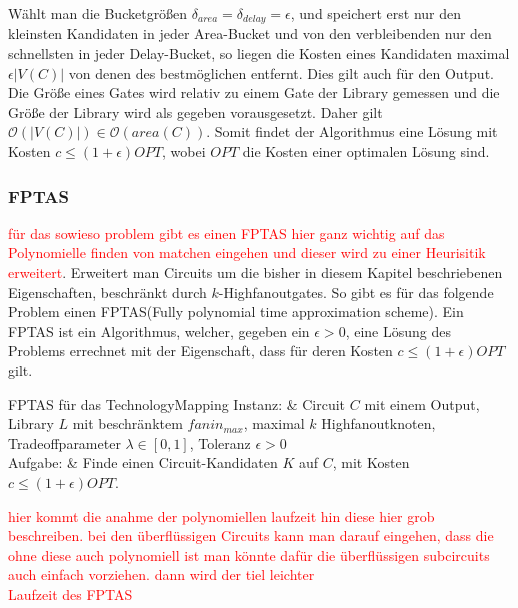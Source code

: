 \documentclass[11pt, a4paper, german]{article}
\newcommand{\TM}{TechnologyMapping}
\begin{document}
Wählt man die Bucketgrößen $\delta_{area} = \delta_{delay} = \epsilon$, und speichert erst nur den kleinsten Kandidaten in jeder Area-Bucket und von den verbleibenden nur den schnellsten in jeder Delay-Bucket, so liegen die Kosten eines Kandidaten maximal $\epsilon |V(C)|$ von denen des bestmöglichen entfernt. Dies gilt auch für den Output. \\
Die Größe eines Gates wird relativ zu einem Gate der Library gemessen und die Größe der Library wird als gegeben vorausgesetzt. Daher gilt  $\mathcal{O}(|V(C)|) \in \mathcal{O}(area(C)) $. Somit findet der Algorithmus eine Lösung mit Kosten $c\leq (1+\epsilon)OPT$, wobei $OPT$ die Kosten einer optimalen Lösung sind.

\subsubsection{FPTAS}
\label{subsubsec:fptas}
\textcolor{red}{für das sowieso problem gibt es einen FPTAS hier ganz wichtig auf das Polynomielle finden von matchen eingehen und dieser wird zu einer Heurisitik erweitert}. 
Erweitert man Circuits um die bisher in diesem Kapitel beschriebenen Eigenschaften, beschränkt durch $k$-Highfanoutgates. So gibt es für das folgende Problem einen FPTAS(Fully polynomial time approximation scheme). Ein FPTAS ist ein Algorithmus, welcher, gegeben ein $\epsilon > 0$, eine Lösung des Problems errechnet mit der Eigenschaft, dass für deren Kosten $c \leq (1+\epsilon)OPT$ gilt. \\
 \begin{problem}[framed]{FPTAS für das \TM}
  Instanz:  & Circuit $C$ mit einem Output, Library $L$ mit beschr\"anktem $fanin_{max}$, maximal $k$ Highfanoutknoten, Tradeoffparameter $\lambda \in [0,1]$, Toleranz $\epsilon > 0$ \\
  Aufgabe: &  Finde einen Circuit-Kandidaten $K$ auf $C$, mit Kosten $c \leq (1+\epsilon)OPT$.
\end{problem}
\textcolor{red}{hier kommt die anahme der polynomiellen laufzeit hin diese hier grob beschreiben. bei den überflüssigen Circuits kann man darauf eingehen, dass die ohne diese auch polynomiell ist man könnte dafür die überflüssigen subcircuits auch einfach vorziehen. dann wird der tiel leichter}\\
\textcolor{red}{Laufzeit des FPTAS}
\end{document}
